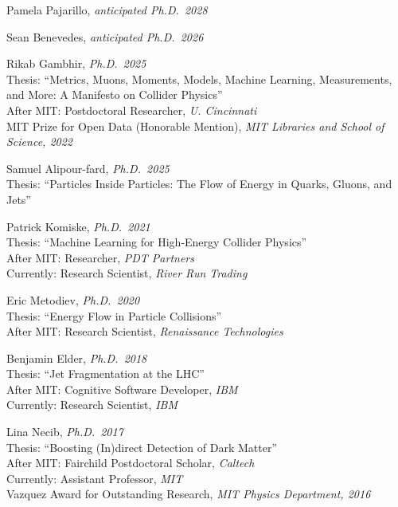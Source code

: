 \bbl

\item Pamela Pajarillo, \emph{anticipated Ph.D.~2028}

\item Sean Benevedes, \emph{anticipated Ph.D.~2026}

\item Rikab Gambhir, \emph{Ph.D.~2025}
\\ Thesis: ``Metrics, Muons, Moments, Models, Machine Learning, Measurements, and More: A Manifesto on Collider Physics''
\\ After MIT: Postdoctoral Researcher, \emph{U. Cincinnati}
\\ MIT Prize for Open Data (Honorable Mention), \emph{MIT Libraries and School of Science, 2022}

\item Samuel Alipour-fard, \emph{Ph.D.~2025}
\\ Thesis: ``Particles Inside Particles: The Flow of Energy in Quarks, Gluons, and Jets''

\item Patrick Komiske, \emph{Ph.D.~2021}
\\ Thesis: ``Machine Learning for High-Energy Collider Physics''
\\ After MIT: Researcher, \emph{PDT Partners}
\\ Currently: Research Scientist, \emph{River Run Trading}

\item Eric Metodiev, \emph{Ph.D.~2020}
\\ Thesis: ``Energy Flow in Particle Collisions''
\\ After MIT: Research Scientist, \emph{Renaissance Technologies}

\item Benjamin Elder, \emph{Ph.D.~2018}
\\ Thesis: ``Jet Fragmentation at the LHC''
\\ After MIT: Cognitive Software Developer, \emph{IBM}
\\ Currently: Research Scientist, \emph{IBM}

\item Lina Necib, \emph{Ph.D.~2017}
\\ Thesis: ``Boosting (In)direct Detection of Dark Matter''
\\ After MIT: Fairchild Postdoctoral Scholar, \emph{Caltech}
\\ Currently: Assistant Professor, \emph{MIT}
\\ Vazquez Award for Outstanding Research, \emph{MIT Physics Department, 2016}

